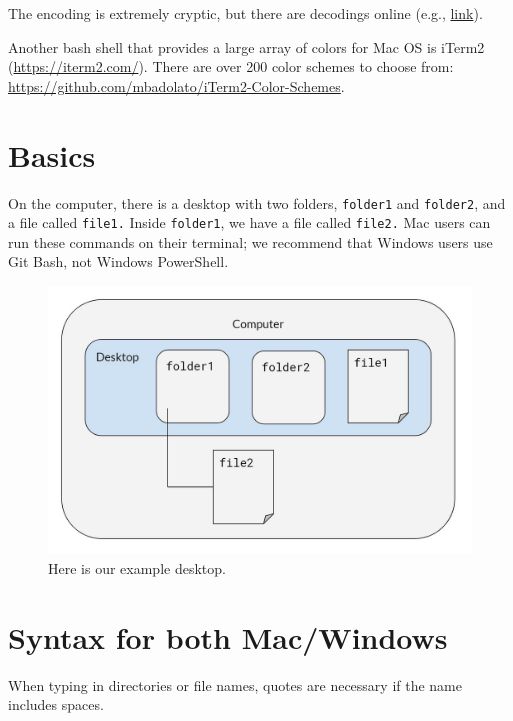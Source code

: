 \documentclass[]{book}
\begin{document}
The encoding is extremely cryptic, but there are decodings online (e.g., \href{http://www.marinamele.com/2014/05/customize-colors-of-your-terminal-in-mac-os-x.html}{link}).

Another bash shell that provides a large array of colors for Mac OS is iTerm2 (\url{https://iterm2.com/}). There are over 200 color schemes to choose from: \url{https://github.com/mbadolato/iTerm2-Color-Schemes}.

\hypertarget{basics-2}{%
\section{Basics}\label{basics-2}}

On the computer, there is a desktop with two folders, \texttt{folder1} and \texttt{folder2}, and a file called \texttt{file1.} Inside \texttt{folder1}, we have a file called \texttt{file2.} Mac users can run these commands on their terminal; we recommend that Windows users use Git Bash, not Windows PowerShell.

\begin{figure}
\centering
\includegraphics{images/ex-desktop.jpg}
\caption{Here is our example desktop.}
\end{figure}

\hypertarget{syntax-for-both-macwindows}{%
\section{Syntax for both Mac/Windows}\label{syntax-for-both-macwindows}}

When typing in directories or file names, quotes are necessary if the name includes spaces.
\end{document}
